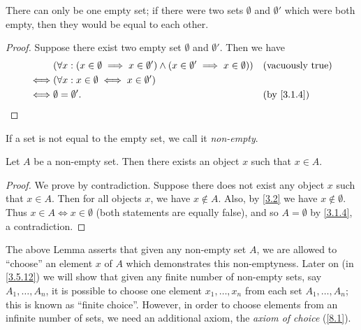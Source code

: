 \begin{ac}\label{ac:3.1.2}
  There can only be one empty set;
  if there were two sets \(\emptyset\) and \(\emptyset'\) which were both empty, then they would be equal to each other.
\end{ac}

\begin{proof}
  Suppose there exist two empty set \(\emptyset\) and \(\emptyset'\).
  Then we have
  \begin{align*}
         & (\forall x : (x \in \emptyset \implies x \in \emptyset') \land (x \in \emptyset' \implies x \in \emptyset)) &  & \text{(vacuously true)} \\
    \iff & (\forall x : x \in \emptyset \iff x \in \emptyset')                                                                                      \\
    \iff & \emptyset = \emptyset'.                                                                                     &  & \by{3.1.4}
  \end{align*}
\end{proof}

\begin{note}
  If a set is not equal to the empty set, we call it \emph{non-empty}.
\end{note}

\setcounter{thm}{5}
\begin{lem}\label{3.1.6}
  Let \(A\) be a non-empty set.
  Then there exists an object \(x\) such that \(x \in A\).
\end{lem}

\begin{proof}
  We prove by contradiction.
  Suppose there does not exist any object \(x\) such that \(x \in A\).
  Then for all objects \(x\), we have \(x \notin A\).
  Also, by \cref{3.2} we have \(x \notin \emptyset\).
  Thus \(x \in A \iff x \in \emptyset\) (both statements are equally false), and so \(A = \emptyset\) by \cref{3.1.4}, a contradiction.
\end{proof}

\begin{rmk}\label{3.1.7}
  The above Lemma asserts that given any non-empty set \(A\), we are allowed to ``choose'' an element \(x\) of \(A\) which demonstrates this non-emptyness.
  Later on (in \cref{3.5.12}) we will show that given any finite number of non-empty sets, say \(A_1, \dots, A_n\), it is possible to choose one element \(x_1, \dots, x_n\) from each set \(A_1, \dots, A_n\);
  this is known as ``finite choice''.
  However, in order to choose elements from an infinite number of sets, we need an additional axiom, the \emph{axiom of choice} (\cref{8.1}).
\end{rmk}

